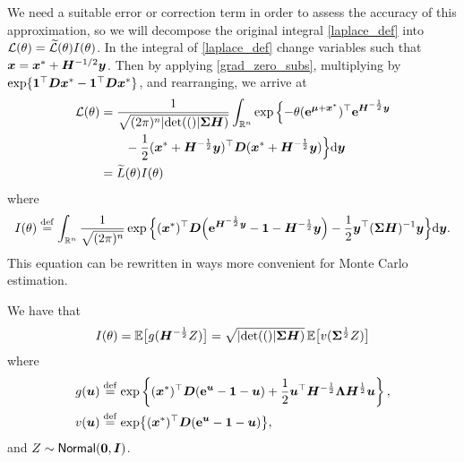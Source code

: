 We need a suitable error or correction term in order to assess the accuracy of
this approximation, so we will decompose the original integral
\eqref{laplace_def} into $\mathcal{L}(\theta) = \widetilde{\mathcal{L}}(\theta)
I(\theta)$.  In the integral of \eqref{laplace_def} change variables such that
$\bm{x} = \bm{x}^* + \bm{H}^{-1/2} \bm{y}$. Then
by applying \eqref{grad_zero_subs}, multiplying by $\exp\{\bm{1}^\top \bm{D}
\bm{x}^* - \bm{1}^\top \bm{D} \bm{x}^* \}$, and rearranging, we arrive at
\begin{align*}
	\mathcal{L}(\theta)
	&= \frac{1}{\sqrt{(2\pi)^n\lvert \mathrm{det}(() \rvert\bm{\Sigma} \bm{H})}}
 \int_{\mathbb{R}^n} \exp\Big\{ {-}\theta (\bm{\mathrm{e}}^{\bm{\mu} + \bm{x}^*})^\top
 \bm{\mathrm{e}}^{\bm{H}^{-\frac12} \bm{y}} \\
	&\qquad - \frac12 (\bm{x}^* + \bm{H}^{-\frac12} \bm{y})^\top \bm{D} (\bm{x}^* + \bm{H}^{-\frac12} \bm{y}) \Big\}\mathrm{d} \bm{y} \\
	&= \widetilde{L}(\theta) I(\theta)
\end{align*}
where
\begin{equation} \label{I_in_propos}
	I(\theta) \overset{\mathrm{def}}{=} \int_{\mathbb{R}^n} \frac{1}{\sqrt{(2\pi)^n}}
 \exp\Big\{ (\bm{x}^*)^\top \bm{D} \Big( \bm{\mathrm{e}}^{\bm{H}^{-\frac12} \bm{y}} - \bm{1} - \bm{H}^{-\frac12} \bm{y} \Big)
  - \frac12 \bm{y}^\top (\bm{\Sigma} \bm{H})^{-1} \bm{y} \Big\} \mathrm{d} \bm{y}.
\end{equation}
This equation can be rewritten in
ways more convenient for Monte Carlo estimation.

\begin{proposition} \label{value_of_I}
We have that
\begin{equation} \label{I_as_norm_exps}
	I(\theta) = \mathbb{E}\bigl[ g(\bm{H}^{-\frac12} Z) \bigr]
 = \sqrt{\lvert \mathrm{det}(() \rvert\bm{\Sigma} \bm{H})} \, \mathbb{E}\bigl[ v(\bm{\Sigma}^{\frac12} Z) \bigr]
\end{equation}
where
\begin{align*}
  g(\bm{u}) &\overset{\mathrm{def}}{=} \exp\left\{ (\bm{x}^*)^\top \bm{D} (\bm{\mathrm{e}}^{\bm{u}} - \bm{1} - \bm{u})
 + \frac12 \bm{u}^\top \bm{H}^{-\frac12} \bm{\Lambda} \bm{H}^{\frac12} \bm{u} \right\},\\
  v(\bm{u}) &\overset{\mathrm{def}}{=} \exp\bigl\{ (\bm{x}^*)^\top \bm{D} (\bm{\mathrm{e}}^{\bm{u}} - \bm{1} - \bm{u})
  \bigr\},
\end{align*}
and $Z \sim\mathsf{Normal}(\bm{0}, \bm{I})$.
\end{proposition}

